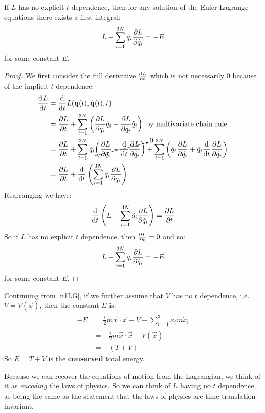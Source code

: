 \documentclass[../main.tex]{subfiles}
\begin{document}
\begin{proposition}
If $L$ has no explicit $t$ dependence, then for any solution of the Euler-Lagrange equations there exists a first integral: \label{LnoT}
  \[
    L - \sum_{i = 1}^{3N}  \dot{q}_i \pderiv{L}{\dot{q}_i} = - E
  \]
  for some constant $E$.
\end{proposition}
\begin{proof}
  We first consider the full derivative $\deriv{L}{t}$ which is not necessarily 0 because of the implicit $t$ dependence:
  \begin{align*}
    \deriv{L}{t} &= \deriv{}{t} L(\vec{q}(t), \dot{\vec{q}}(t), t) \\
                 &= \pderiv{L}{t} + \sum_{i = 1}^{3N} \left(\pderiv{L}{q_i} \dot{q}_i + \pderiv{L}{\dot{q_i}} \ddot{q}_i\right) \text{ by multivariate chain rule}\\
                 &= \pderiv{L}{t} + \sum_{i = 1}^{3N} \dot{q}_i \cancelto{0}{\left(\pderiv{L}{q_i} - \deriv{}{t} \pderiv{L}{\dot{q_i}}\right)} + \sum_{i = 1}^{3N} \left(\ddot{q}_i \pderiv{L}{\dot{q_i}} + \dot{q}_i \deriv{}{t} \pderiv{L}{\dot{q_i}}\right) \\
                 &= \pderiv{L}{t} + \deriv{}{t}\left(\sum_{i = 1}^{3N} \dot{q}_i \pderiv{L}{\dot{q_i}}\right)
  \end{align*}
  Rearranging we have:
  \begin{equation}
    \deriv{}{t}\left(L - \sum_{i = 1}^{3N} \dot{q}_i \pderiv{L}{\dot{q}_i}\right) = \pderiv{L}{t} \label{derivPderiv}
  \end{equation}
  So if $L$ has no explicit $t$ dependence, then $\pderiv{L}{t} = 0$ and so:
  \[
     L - \sum_{i = 1}^{3N} \dot{q}_i \pderiv{L}{\dot{q}_i} = -E
  \]
  for some constant $E$.
\end{proof}
\begin{example}
  Continuing from \cref{n1LG}, if we further assume that $V$ has no $t$ dependence, i.e. $V = V(\vec{x})$, then the constant $E$ is:
  \begin{align*}
    -E &= \frac{1}{2} m \dot{\vec{x}} \cdot \dot{\vec{x}} - V - \sum_{i = 1}^{3} \dot{x}_i m \dot{x}_i \\
       &= -\frac{1}{2} m \dot{\vec{x}} \cdot \dot{\vec{x}} - V(\vec{x}) \\
       &= - (T + V)
  \end{align*}
  So $E = T + V$ is the \textbf{conserved} total energy.
\end{example}
\begin{remark}
  Because we can recover the equations of motion from the Lagrangian, we think of it as \textit{encoding} the laws of physics.
  So we can think of $L$ having no $t$ dependence as being the same as the statement that the laws of physics are time translation invariant.
\end{remark}
\end{document}
